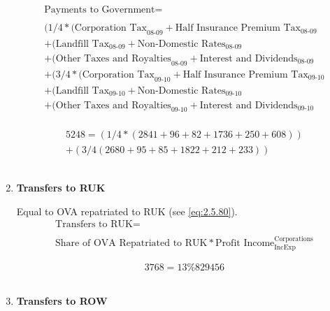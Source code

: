 \begin{enumerate}
\begin{equation}
\begin{split}
\text{Payments to Government} =  \\ \\
(1/4*(\text{Corporation Tax}_\text{08-09}+\text{Half Insurance Premium Tax}_\text{08-09}\\
+(\text{Landfill Tax}_\text{08-09}+\text{Non-Domestic Rates}_\text{08-09}\\
+(\text{Other Taxes and Royalties}_\text{08-09}+\text{Interest and Dividends}_\text{08-09}\\
+(3/4*(\text{Corporation Tax}_\text{09-10}+\text{Half Insurance Premium Tax}_\text{09-10}\\
+(\text{Landfill Tax}_\text{09-10}+\text{Non-Domestic Rates}_\text{09-10}\\
+(\text{Other Taxes and Royalties}_\text{09-10}+\text{Interest and Dividends}_\text{09-10}\\
\end{split} \label{eq:2.5.30}
\end{equation}

\begin{equation} \nonumber
\begin{split}
5248 = (1/4*(2841+96+82+1736+250+608))\\
+(3/4(2680+95+85+1822+212+233))
\end{split}
\end{equation}\\


\item \textbf {Transfers to RUK}

Equal to OVA repatriated to RUK (see \ref{eq:2.5.80}). \cite{ScotGov2012}\\

\begin{equation}
\begin{split}
\text{Transfers to RUK} =  \\ \\
\text{Share of OVA Repatriated to RUK}*\text{Profit Income}^\text{Corporations}_\text{IncExp}
\end{split} \label{eq:2.5.31}
\end{equation}

\begin{equation} \nonumber
3768 = 13\%829456
\end{equation}\\


\item \textbf {Transfers to ROW}


\end{enumerate}
